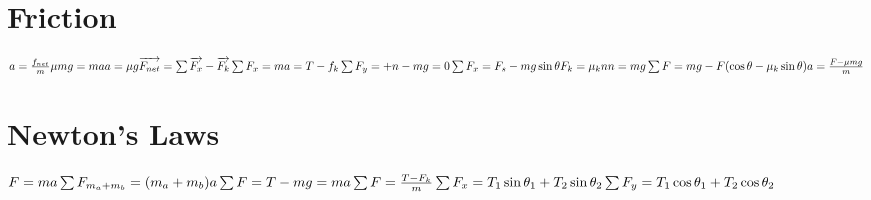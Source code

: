 \documentclass[11pt]{article}
\begin{document}
\begin{paracol}{3}
        \section*{Friction}
        \begin{fleqn}
            $
            a=\frac{f_{net}}{m} \newline
            \mu mg = ma \newline
            a= \mu g \newline
            \overrightarrow{F_{net}} = \sum \overrightarrow{F_x}-\overrightarrow{F_{k}} \newline
            \sum F_x = ma = T-f_k \newline
            \sum F_y = +n-mg = 0 \newline
            \sum F_x = F_s - mg\sin\theta \newline
            F_k = \mu_{k}n \newline
            n=mg \newline
            \sum F=mg-F(\cos\theta - \mu_k\sin\theta) \newline
            a = \frac{F-\mu mg}{m} \newline
            $
        \end{fleqn}
        \section*{Newton's Laws}
        \begin{fleqn}
            $
            F=ma \newline
            \sum F_{m_a+m_b} = (m_a+m_b)a \newline
            \sum F = T - mg = ma \newline
            \sum F = \frac{T-F_k}{m} \newline
            \sum F_x=T_1\sin\theta_1 + T_2\sin\theta_2 \newline
            \sum F_y=T_1\cos\theta_1 + T_2\cos\theta_2
            $
        \end{fleqn}
    \end{paracol}
\end{document}
